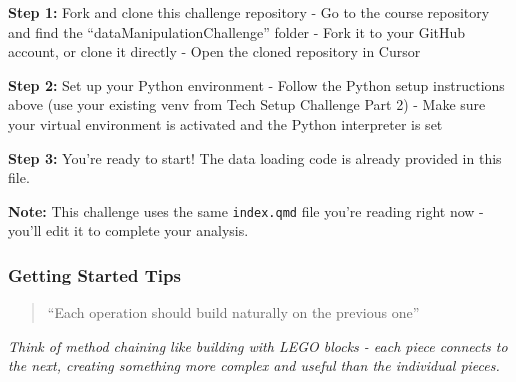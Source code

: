 \documentclass[
]{article}
\begin{document}
\begin{tcolorbox}[enhanced jigsaw, colbacktitle=quarto-callout-important-color!10!white, toptitle=1mm, colframe=quarto-callout-important-color-frame, bottomtitle=1mm, colback=white, left=2mm, breakable, coltitle=black, bottomrule=.15mm, rightrule=.15mm, titlerule=0mm, opacityback=0, title=\textcolor{quarto-callout-important-color}{\faExclamation}\hspace{0.5em}{📁 Getting Started}, arc=.35mm, opacitybacktitle=0.6, toprule=.15mm, leftrule=.75mm]

\textbf{Step 1:} Fork and clone this challenge repository - Go to the
course repository and find the ``dataManipulationChallenge'' folder -
Fork it to your GitHub account, or clone it directly - Open the cloned
repository in Cursor

\textbf{Step 2:} Set up your Python environment - Follow the Python
setup instructions above (use your existing venv from Tech Setup
Challenge Part 2) - Make sure your virtual environment is activated and
the Python interpreter is set

\textbf{Step 3:} You're ready to start! The data loading code is already
provided in this file.

\textbf{Note:} This challenge uses the same \texttt{index.qmd} file
you're reading right now - you'll edit it to complete your analysis.

\end{tcolorbox}

\subsubsection{Getting Started Tips}\label{getting-started-tips}

\begin{tcolorbox}[enhanced jigsaw, colbacktitle=quarto-callout-note-color!10!white, toptitle=1mm, colframe=quarto-callout-note-color-frame, bottomtitle=1mm, colback=white, left=2mm, breakable, coltitle=black, bottomrule=.15mm, rightrule=.15mm, titlerule=0mm, opacityback=0, title=\textcolor{quarto-callout-note-color}{\faInfo}\hspace{0.5em}{🎯 Method Chaining Philosophy}, arc=.35mm, opacitybacktitle=0.6, toprule=.15mm, leftrule=.75mm]

\begin{quote}
``Each operation should build naturally on the previous one''
\end{quote}

\emph{Think of method chaining like building with LEGO blocks - each
piece connects to the next, creating something more complex and useful
than the individual pieces.}

\end{tcolorbox}
\end{document}
